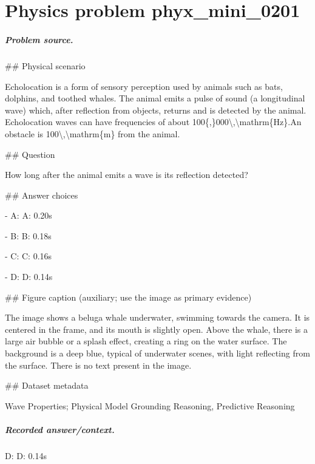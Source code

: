 
\chapter{Physics problem phyx\_mini\_0201}
\label{ch:PhyXMiniProblems_problem_phyx_mini_0201}

\paragraph{Problem source.}
\#\# Physical scenario

Echolocation is a form of sensory perception used by animals such as bats, dolphins, and toothed whales. The animal emits a pulse of sound (a longitudinal wave) which, after reflection from objects, returns and is detected by the animal. Echolocation waves can have frequencies of about 100\{,\}000\textbackslash{},\textbackslash{}mathrm\{Hz\}.An obstacle is 100\textbackslash{},\textbackslash{}mathrm\{m\} from the animal.

\#\# Question

How long after the animal emits a wave is its reflection detected?

\#\# Answer choices

- A: A: 0.20s

- B: B: 0.18s

- C: C: 0.16s

- D: D: 0.14s

\#\# Figure caption (auxiliary; use the image as primary evidence)

The image shows a beluga whale underwater, swimming towards the camera. It is centered in the frame, and its mouth is slightly open. Above the whale, there is a large air bubble or a splash effect, creating a ring on the water surface. The background is a deep blue, typical of underwater scenes, with light reflecting from the surface. There is no text present in the image.

\#\# Dataset metadata

Wave Properties; Physical Model Grounding Reasoning, Predictive Reasoning

\paragraph{Recorded answer/context.}
D: D: 0.14s

